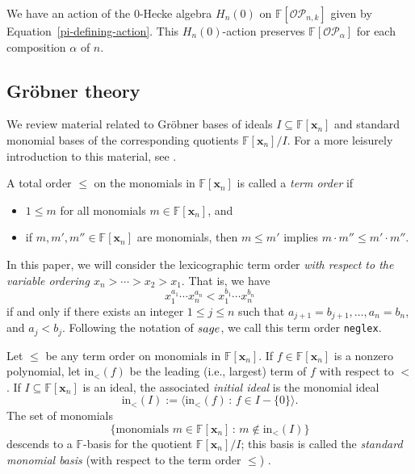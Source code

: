 \documentclass[10pt]{amsart}
\theoremstyle{definition}
\newcommand{\init}{{\mathrm {in}}}
\newcommand{\OP}{{\mathcal{OP}}}
\newcommand{\FF}{{\mathbb{F}}}
\newcommand{\xx}{{\mathbf {x}}}
\newcommand{\pib}{\overline{\pi}}
\begin{document}
We have an action of the $0$-Hecke algebra $H_n(0)$ on $\FF[\OP_{n,k}]$ given
by Equation~\eqref{pi-defining-action}.
This $H_n(0)$-action preserves $\FF[\OP_\alpha]$ for each composition $\alpha$ of $n$.




\subsection{Gr\"obner theory}
We review material related to Gr\"obner bases of ideals $I \subseteq \FF[\xx_n]$ and standard monomial
bases of the corresponding quotients $\FF[\xx_n]/I$.  For a more leisurely introduction to this material,
see \cite{CLO}.


A total order $\leq$ on the monomials in $\FF[\xx_n]$ is called a \emph{term order} if 
\begin{itemize}
\item $1 \leq m$ for all monomials $m \in \FF[\xx_n]$, and
\item  if $m, m', m'' \in \FF[\xx_n]$ are monomials, then $m \leq m'$ implies $m \cdot m'' \leq m' \cdot m''$.
\end{itemize}
In this paper, we will consider the lexicographic term order \emph{with respect to the variable ordering
$x_n > \cdots > x_2 > x_1$}.  That is, we have
\begin{equation*}
x_1^{a_1} \cdots x_n^{a_n} < x_1^{b_1}  \cdots x_n^{b_n}
\end{equation*}
if and only if there exists an integer $1 \leq  j \leq n$ such that $a_{j+1} = b_{j+1}, \dots, a_n = b_n$, and
$a_j < b_j$.
Following the notation of $\textsc{sage}$,
we call this term order {\tt neglex}.

Let $\leq$ be any term order on monomials in $\FF[\xx_n]$.  If $f \in \FF[\xx_n]$ is a nonzero polynomial,
let $\init_<(f)$ be the leading (i.e., largest) term of $f$ with respect to $<$.  If $I \subseteq \FF[\xx_n]$ is an ideal, the 
associated \emph{initial ideal} is the monomial ideal
\begin{equation}
\init_<(I) := \langle \init_<(f) \,:\, f \in I - \{0\} \rangle.
\end{equation}
The set of monomials
\begin{equation}
\{ \text{monomials $m \in \FF[\xx_n]$} \,:\, m \notin \init_<(I) \}
\end{equation}
descends to a $\FF$-basis for the quotient  ${\FF[\xx_n]} / {I}$; this basis is called the 
\emph{standard monomial basis} (with respect to the term order $\leq$) \cite[Prop. 1, p. 230]{CLO}.
\end{document}
